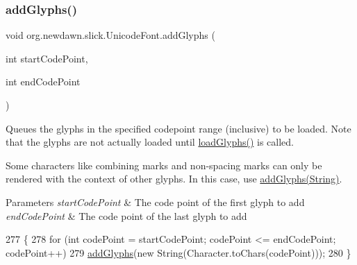 \subsubsection{\texorpdfstring{add\+Glyphs()}{addGlyphs()}\hspace{0.1cm}{\footnotesize\ttfamily [1/2]}}
{\footnotesize\ttfamily void org.\+newdawn.\+slick.\+Unicode\+Font.\+add\+Glyphs (\begin{DoxyParamCaption}\item[{int}]{start\+Code\+Point,  }\item[{int}]{end\+Code\+Point }\end{DoxyParamCaption})\hspace{0.3cm}{\ttfamily [inline]}}

Queues the glyphs in the specified codepoint range (inclusive) to be loaded. Note that the glyphs are not actually loaded until \mbox{\hyperlink{classorg_1_1newdawn_1_1slick_1_1_unicode_font_abf14d8ad33f80b66e14990417bd04088}{load\+Glyphs()}} is called.

Some characters like combining marks and non-\/spacing marks can only be rendered with the context of other glyphs. In this case, use \mbox{\hyperlink{classorg_1_1newdawn_1_1slick_1_1_unicode_font_a438d5ec21bef1e59730969d830041416}{add\+Glyphs(\+String)}}.


\begin{DoxyParams}{Parameters}
{\em start\+Code\+Point} & The code point of the first glyph to add \\
\hline
{\em end\+Code\+Point} & The code point of the last glyph to add \\
\hline
\end{DoxyParams}

\begin{DoxyCode}
277                                                                 \{
278         \textcolor{keywordflow}{for} (\textcolor{keywordtype}{int} codePoint = startCodePoint; codePoint <= endCodePoint; codePoint++)
279             \mbox{\hyperlink{classorg_1_1newdawn_1_1slick_1_1_unicode_font_a54603f9fb72e1339e669be73d08a3963}{addGlyphs}}(\textcolor{keyword}{new} String(Character.toChars(codePoint)));
280     \}
\end{DoxyCode}
\mbox{\label{classorg_1_1newdawn_1_1slick_1_1_unicode_font_a438d5ec21bef1e59730969d830041416}} 
